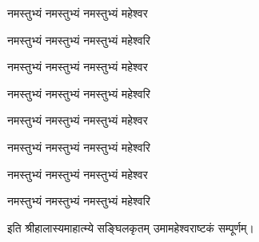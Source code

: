 \begin{center}

{नमस्तुभ्यं नमस्तुभ्यं नमस्तुभ्यं महेश्वर}

{नमस्तुभ्यं नमस्तुभ्यं नमस्तुभ्यं महेश्वरि}

{नमस्तुभ्यं नमस्तुभ्यं नमस्तुभ्यं महेश्वर}

{नमस्तुभ्यं नमस्तुभ्यं नमस्तुभ्यं महेश्वरि}

{नमस्तुभ्यं नमस्तुभ्यं नमस्तुभ्यं महेश्वर}

{नमस्तुभ्यं नमस्तुभ्यं नमस्तुभ्यं महेश्वरि}

{नमस्तुभ्यं नमस्तुभ्यं नमस्तुभ्यं महेश्वर}

{नमस्तुभ्यं नमस्तुभ्यं नमस्तुभ्यं महेश्वरि}

इति श्रीहालास्यमाहात्म्ये सङ्घिलकृतम् उमामहेश्वराष्टकं सम्पूर्णम्।

\end{center}

\closesection
